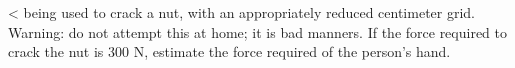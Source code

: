 <%
being used to crack a nut, with an appropriately reduced
centimeter grid. Warning: do not attempt this at home; it is
bad manners. If the force required to crack the nut is 300
N, estimate the force required of the person's hand.
